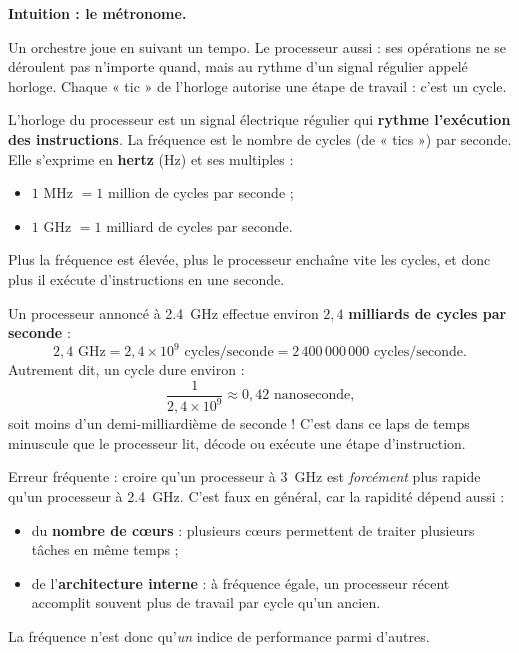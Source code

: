\documentclass[11pt]{article}
\newcommand{\cle}[1]{{\popxbold\color{popdark}#1}}
\newcounter{popsec}
\newcounter{popsub}
\newcommand{\courssub}[1]{%
  \stepcounter{popsub}%
  \par\vspace{9pt}\noindent{\popxbold\fontsize{11.5}{13}\selectfont\color{popink}{\color{poporange}\thepopsec.\thepopsub}\hspace{6pt}#1}\par\nopagebreak\vspace{4pt}
}
\begin{document}
\courssub{L'horloge et la fréquence}

\textbf{Intuition : le métronome.}\par

Un orchestre joue en suivant un tempo. Le processeur aussi : ses opérations ne se déroulent pas n'importe quand, mais au rythme d'un signal régulier appelé \cle{horloge}. Chaque « tic » de l'horloge autorise une étape de travail : c'est un \cle{cycle}.

\begin{definition}
L'\cle{horloge} du processeur est un signal électrique régulier qui \textbf{rythme l'exécution des instructions}. La \cle{fréquence} est le nombre de cycles (de « tics ») par seconde. Elle s'exprime en \textbf{hertz} (Hz) et ses multiples :
\begin{itemize}
\item $1$ MHz $= 1$ million de cycles par seconde ;
\item $1$ GHz $= 1$ milliard de cycles par seconde.
\end{itemize}
\end{definition}

Plus la fréquence est élevée, plus le processeur enchaîne vite les cycles, et donc plus il exécute d'instructions en une seconde.

\begin{exemplebox}
Un processeur annoncé à \SI{2,4}{GHz} effectue environ $2,4$ \textbf{milliards de cycles par seconde} :
\[ 2,4 \text{ GHz} = 2,4 \times 10^{9} \text{ cycles/seconde} = 2\,400\,000\,000 \text{ cycles/seconde.} \]
Autrement dit, un cycle dure environ :
\[ \frac{1}{2,4 \times 10^{9}} \approx 0,42 \text{ nanoseconde,} \]
soit moins d'un demi-milliardième de seconde ! C'est dans ce laps de temps minuscule que le processeur lit, décode ou exécute une étape d'instruction.
\end{exemplebox}

\begin{attention}
Erreur fréquente : croire qu'un processeur à \SI{3}{GHz} est \emph{forcément} plus rapide qu'un processeur à \SI{2,4}{GHz}. C'est faux en général, car la rapidité dépend aussi :
\begin{itemize}
\item du \textbf{nombre de cœurs} : plusieurs cœurs permettent de traiter plusieurs tâches en même temps ;
\item de l'\textbf{architecture interne} : à fréquence égale, un processeur récent accomplit souvent plus de travail par cycle qu'un ancien.
\end{itemize}
La fréquence n'est donc qu'\emph{un} indice de performance parmi d'autres.
\end{attention}
\end{document}
